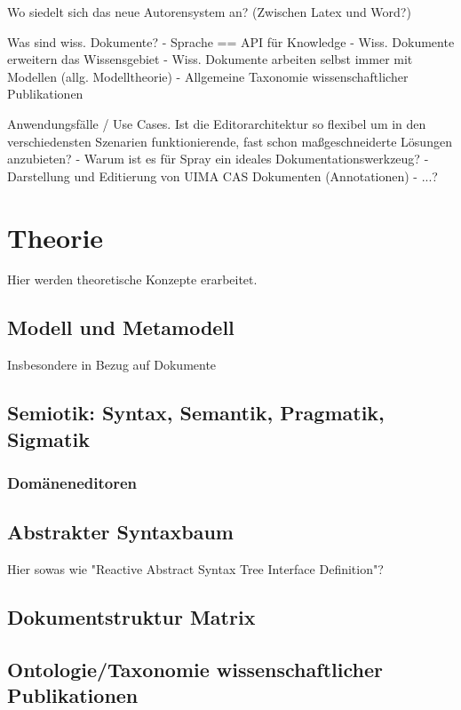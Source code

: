 Wo siedelt sich das neue Autorensystem an? (Zwischen Latex und Word?)

Was sind wiss. Dokumente?
  - Sprache == API für Knowledge
  - Wiss. Dokumente erweitern das Wissensgebiet
  - Wiss. Dokumente arbeiten selbst immer mit Modellen (allg. Modelltheorie)
  - Allgemeine Taxonomie wissenschaftlicher Publikationen

Anwendungsfälle / Use Cases. Ist die Editorarchitektur so flexibel um in den
verschiedensten Szenarien funktionierende, fast schon maßgeschneiderte Lösungen
anzubieten?
  - Warum ist es für Spray ein ideales Dokumentationswerkzeug?
  - Darstellung und Editierung von UIMA CAS Dokumenten (Annotationen)
  - ...?



\chapter{Theorie}

Hier werden theoretische Konzepte erarbeitet.

\section{Modell und Metamodell}

Insbesondere in Bezug auf Dokumente

\section{Semiotik: Syntax, Semantik, Pragmatik, Sigmatik}

\subsection{Domäneneditoren}

\section{Abstrakter Syntaxbaum}

Hier sowas wie "Reactive Abstract Syntax Tree Interface Definition"?

\section{Dokumentstruktur Matrix}

\section{Ontologie/Taxonomie wissenschaftlicher Publikationen}

